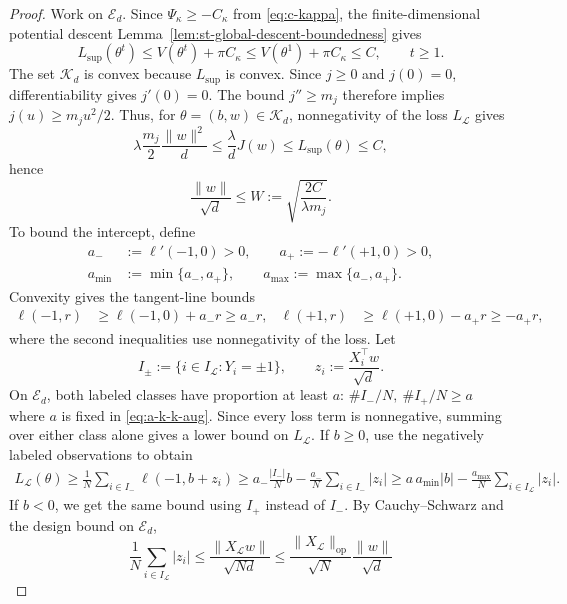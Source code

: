 \begin{proof}
Work on $\mathcal E_d$. Since $\Psi_\kappa\geq-C_\kappa$ from \eqref{eq:c-kappa}, the
finite-dimensional potential descent Lemma~\ref{lem:st-global-descent-boundedness} gives
\[
    L_{\mathrm{sup}}(\theta^t)
    \leq V(\theta^t)+\pi C_\kappa
    \leq V(\theta^1)+\pi C_\kappa\leq C,
    \qquad t\geq1.
\]
The set $\mathcal K_d$ is convex because $L_{\mathrm{sup}}$
is convex. Since $j\geq0$ and $j(0)=0$, differentiability gives
$j'(0)=0$. The bound $j''\geq m_j$ therefore implies
$j(u)\geq m_j u^2/2$.
Thus, for $\theta=(b,w)\in\mathcal K_d$, nonnegativity of
the loss $L_{\mathcal L}$ gives
\[
    \lambda \frac{m_j}{2} \frac{\| w \|^2}{d} \le \frac{\lambda}{d}J(w) \le L_{\mathrm{sup}}(\theta) \le C, 
\]
hence
\[
    \frac{\|w\|}{\sqrt d}
    \le   W:=\sqrt{\frac{2C}{\lambda m_j}}.
\]
To bound the intercept, define
\[
\begin{aligned}
    a_-&:=\ell'(-1,0)>0,\qquad
    a_+:=-\ell'(+1,0)>0,\\
    a_{\min}&:=\min\{a_-,a_+\},\qquad
    a_{\max}:=\max\{a_-,a_+\}.
\end{aligned}
\]
Convexity gives the tangent-line bounds
\[
\begin{aligned}
    \ell(-1,r)
    &\geq \ell(-1,0)+a_-r
     \geq a_-r,&
    \ell(+1,r)
    &\geq \ell(+1,0)-a_+r
     \geq -a_+r,
\end{aligned}
\]
where the second inequalities use nonnegativity of the loss.
Let
\[
    I_\pm:=\{i\in I_{\mathcal L}:Y_i=\pm1\},
    \qquad
    z_i:=\frac{X_i^\top w}{\sqrt d}.
\]
On $\mathcal E_d$, both labeled classes have proportion at least
$a$: $\#I_- / N, \ \# I_+/ N \geq a$ where $a$ is fixed in \eqref{eq:a-k-k-aug}.
Since every loss term is nonnegative, summing over either class
alone gives a lower bound on $L_{\mathcal L}$.
If $b\geq0$, use the negatively labeled observations to obtain
\begin{align}
    L_{\mathcal L}(\theta)
    \geq \frac1N\sum_{i\in I_-}\ell(-1,b+z_i)
    \geq a_-\frac{|I_-|}{N}b
           -\frac{a_-}{N}\sum_{i\in I_-}|z_i|
    \geq a\,a_{\min}|b|
           -\frac{a_{\max}}{N}
              \sum_{i\in I_{\mathcal L}}|z_i|.
    \label{eq:labeled-loss}
\end{align}
If $b<0$, we get the same bound using $I_+$ instead of $I_-$.
By Cauchy--Schwarz and the design bound on $\mathcal E_d$,
\[
    \frac1N\sum_{i\in I_{\mathcal L}}|z_i|
    \leq \frac{\|X_{\mathcal L}w\|}{\sqrt{Nd}}
    \leq
    \frac{\|X_{\mathcal L}\|_{\mathrm{op}}}{\sqrt N}
    \frac{\|w\|}{\sqrt d}
\]
\end{proof}
